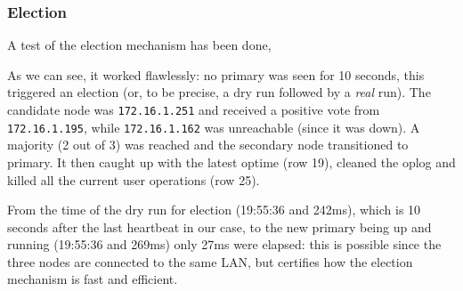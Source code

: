 \documentclass[11pt]{article}
\begin{document}
\subsubsection{Election}
A test of the election mechanism has been done,


As we can see, it worked flawlessly: no primary was seen for 10 seconds, this triggered an election (or, to be precise, a dry run followed by a \textit{real} run).
The candidate node was \lstinline{172.16.1.251} and received a positive vote from \lstinline{172.16.1.195}, while \lstinline{172.16.1.162} was unreachable (since it was down). A majority (2 out of 3) was reached and the secondary node transitioned to primary. It then caught up with the latest optime (row 19), cleaned the oplog and killed all the current user operations (row 25).

From the time of the dry run for election (19:55:36 and 242ms), which is 10 seconds after the last heartbeat in our case, to the new primary being up and running (19:55:36 and 269ms) only 27ms were elapsed: this is possible since the three nodes are connected to the same LAN, but certifies how the election mechanism is fast and efficient.
\end{document}
